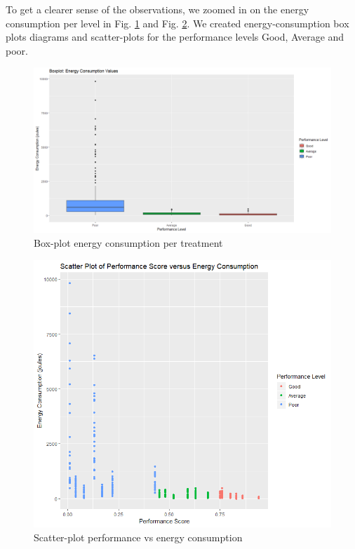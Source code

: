 To get a clearer sense of the observations, we zoomed in on the energy consumption per level in Fig. \ref{fig:boxecv} and Fig. \ref{fig:scatpvsec}. We created energy-consumption box plots diagrams and scatter-plots for the performance levels Good, Average and poor.

\begin{figure}[H]
  \includegraphics[width=\linewidth]{./NewImages/Fig_5_Box_Plot_Energy_Per_Level.png}
  \caption{Box-plot energy consumption per treatment}
  \label{fig:boxecv}
\end{figure}

\begin{figure}[H]
  \includegraphics[width=\linewidth]{./NewImages/Fig_6_Scatterplot_Perf_score_Energy.png}
  \caption{Scatter-plot performance vs energy consumption}
  \label{fig:scatpvsec}
\end{figure}

